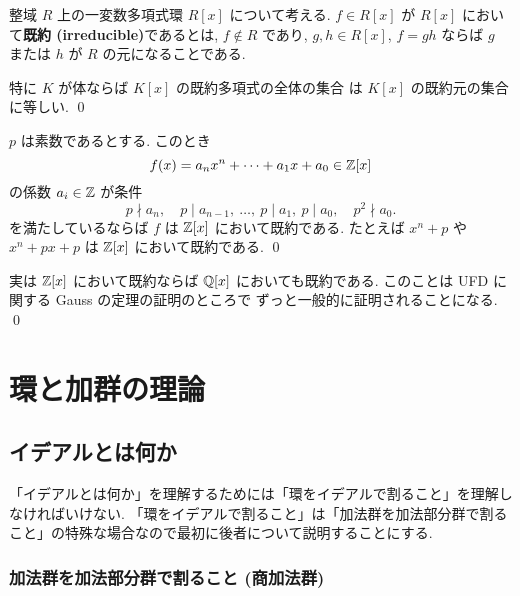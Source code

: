 \documentclass[12pt,twoside]{jarticle}
\begin{document}
\begin{definition}[既約多項式]
 整域 $R$ 上の一変数多項式環 $R[x]$ について考える.
 $f\in R[x]$ が $R[x]$ において{\bf 既約 (irreducible)}であるとは, 
 $f\not\in R$ であり, 
 $g,h\in R[x]$, $f=gh$ ならば $g$ または $h$ が $R$ の元になることである.
 
 特に $K$ が体ならば $K[x]$ の既約多項式の全体の集合
 は $K[x]$ の既約元の集合に等しい. 
 \qed
\end{definition}

\begin{question}
\label{q:Eisenstein/Z}
 $p$ は素数であるとする. このとき
 \begin{equation*}
  f(x) = a_nx^n + \cdots + a_1x + a_0 \in {\mathbb Z}[x]
 \end{equation*}
 の係数 $a_i\in{\mathbb Z}$ が条件
 \begin{equation*}
  p\nmid a_n, \quad
  p\mid a_{n-1},\ \ldots,\ p\mid a_1,\ p\mid a_0, \quad
  p^2\nmid a_0.
 \end{equation*}
 を満たしているならば $f$ は ${\mathbb Z}[x]$ において既約である.
 たとえば $x^n + p$ や $x^n + px + p$ は ${\mathbb Z}[x]$ において既約である.
 \qed
\end{question}

\begin{rem}
 実は ${\mathbb Z}[x]$ において既約ならば ${\mathbb Q}[x]$ においても既約である.
 このことは UFD に関する Gauss の定理の証明のところで
 ずっと一般的に証明されることになる.
 \qed
\end{rem}


\section{環と加群の理論}

\setcounter{subsection}{4}

\subsection{イデアルとは何か}

「イデアルとは何か」を理解するためには「環をイデアルで割ること」を理解し
なければいけない. 「環をイデアルで割ること」は「加法群を加法部分群で割る
こと」の特殊な場合なので最初に後者について説明することにする.

\subsubsection{加法群を加法部分群で割ること (商加法群)}
\end{document}
